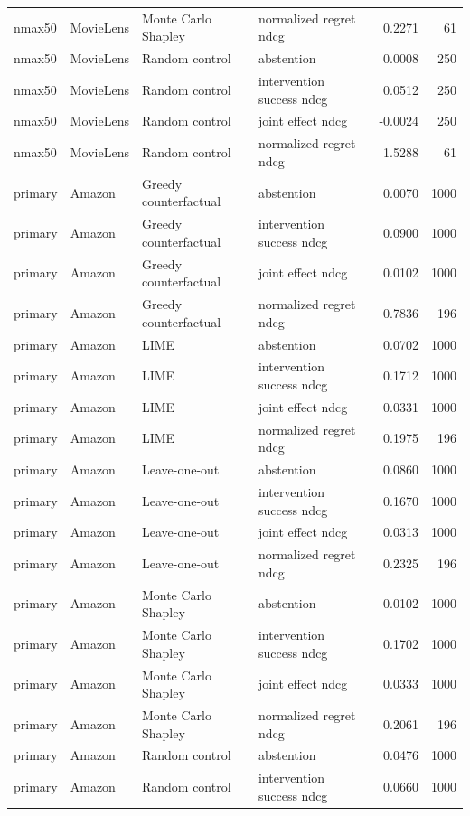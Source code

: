 \begin{longtable}{@{}p{}p{}p{}p{}rr@{}}
nmax50 & MovieLens & Monte Carlo Shapley & normalized regret ndcg & 0.2271 & 61 \\
nmax50 & MovieLens & Random control & abstention & 0.0008 & 250 \\
nmax50 & MovieLens & Random control & intervention success ndcg & 0.0512 & 250 \\
nmax50 & MovieLens & Random control & joint effect ndcg & -0.0024 & 250 \\
nmax50 & MovieLens & Random control & normalized regret ndcg & 1.5288 & 61 \\
primary & Amazon & Greedy counterfactual & abstention & 0.0070 & 1000 \\
primary & Amazon & Greedy counterfactual & intervention success ndcg & 0.0900 & 1000 \\
primary & Amazon & Greedy counterfactual & joint effect ndcg & 0.0102 & 1000 \\
primary & Amazon & Greedy counterfactual & normalized regret ndcg & 0.7836 & 196 \\
primary & Amazon & LIME & abstention & 0.0702 & 1000 \\
primary & Amazon & LIME & intervention success ndcg & 0.1712 & 1000 \\
primary & Amazon & LIME & joint effect ndcg & 0.0331 & 1000 \\
primary & Amazon & LIME & normalized regret ndcg & 0.1975 & 196 \\
primary & Amazon & Leave-one-out & abstention & 0.0860 & 1000 \\
primary & Amazon & Leave-one-out & intervention success ndcg & 0.1670 & 1000 \\
primary & Amazon & Leave-one-out & joint effect ndcg & 0.0313 & 1000 \\
primary & Amazon & Leave-one-out & normalized regret ndcg & 0.2325 & 196 \\
primary & Amazon & Monte Carlo Shapley & abstention & 0.0102 & 1000 \\
primary & Amazon & Monte Carlo Shapley & intervention success ndcg & 0.1702 & 1000 \\
primary & Amazon & Monte Carlo Shapley & joint effect ndcg & 0.0333 & 1000 \\
primary & Amazon & Monte Carlo Shapley & normalized regret ndcg & 0.2061 & 196 \\
primary & Amazon & Random control & abstention & 0.0476 & 1000 \\
primary & Amazon & Random control & intervention success ndcg & 0.0660 & 1000 \\

\end{longtable}
